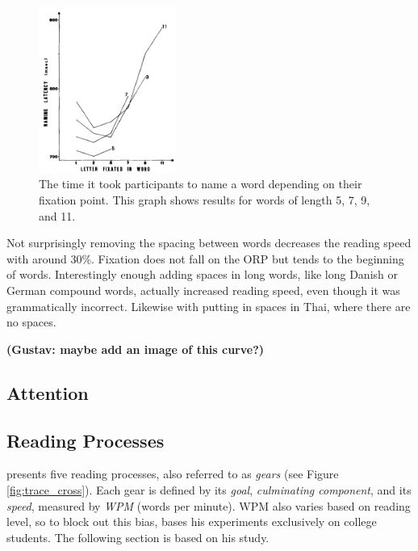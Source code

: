 \begin{figure}[htbp]
\centering
\includegraphics[width=0.4\textwidth]{Pics/ucurve}
\caption{The time it took participants to name a word depending on their fixation point. This graph shows results for words of length 5, 7, 9, and 11. \protect\cite{oregan_convenient_1984}}
\label{fig:ucurve}
\end{figure}

Not surprisingly removing the spacing between words decreases the reading speed with around 30\%. Fixation does not fall on the ORP but tends to the beginning of words. Interestingly enough adding spaces in long words, like long Danish or German compound words, actually increased reading speed, even though it was grammatically incorrect. Likewise with putting in spaces in Thai, where there are no spaces.

\textbf{(Gustav: maybe add an image of this curve?)}

\subsection{Attention}

\subsection{Reading Processes}
 presents five reading processes, also referred to as \textit{gears} (see Figure \ref{fig:trace_cross}). Each gear is defined by its \textit{goal}, \textit{culminating component}, and its \textit{speed}, measured by \textit{WPM} (words per minute). WPM also varies based on reading level, so to block out this bias, \citeauthor{carver_reading_1992} bases his experiments exclusively on college students. The following section is based on his study.

